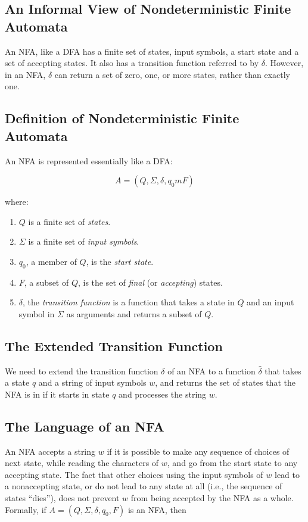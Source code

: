 \documentclass[]{article}
\begin{document}
  \subsection*{An Informal View of Nondeterministic Finite Automata}
    An NFA, like a DFA has a finite set of states, input symbols, a start 
    state and a set of accepting states. It also has a transition function 
    referred to by $\delta$. However, in an NFA, $\delta$ can return a set of 
    zero, one, or more states, rather than exactly one.
    
  \subsection*{Definition of Nondeterministic Finite Automata}
    An NFA is represented essentially like a DFA:
    
      \[ A = (Q, \Sigma, \delta, q_0m F) \]
      
    where:
      \begin{enumerate}
        \item $Q$ is a finite set of \emph{states}.
        \item $\Sigma$ is a finite set of \emph{input symbols}.
        \item $q_0$, a member of $Q$, is the \emph{start state}.
        \item $F$, a subset of $Q$, is the set of \emph{final} (or 
        \emph{accepting}) states.
        \item $\delta$, the \emph{transition function} is a function that 
        takes a state in $Q$ and an input symbol in $\Sigma$ as arguments and 
        returns a subset of $Q$.
      \end{enumerate}
  
  \subsection*{The Extended Transition Function}
    We need to extend the transition function $\delta$ of an NFA to a function 
    $\hat{\delta}$ that takes a state $q$ and a string of input symbols $w$, 
    and returns the set of states that the NFA is in if it starts in state $q$ 
    and processes the string $w$.
    
  \subsection*{The Language of an NFA}
    An NFA accepts a string $w$ if it is possible to make any sequence of 
    choices of next state, while reading the characters of $w$, and go from 
    the start state to any accepting state. The fact that other choices using 
    the input symbols of $w$ lead to a nonaccepting state, or do not lead to 
    any state at all (i.e., the sequence of states ``dies''), does not prevent 
    $w$ from being accepted by the NFA as a whole. Formally, if $A = (Q, 
    \Sigma, \delta, q_0, F)$ is an NFA, then
    
\end{document}
